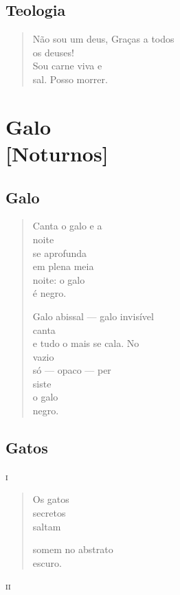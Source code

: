 \chapter{Teologia}

\begin{verse}
Não sou um deus, Graças a todos\\
os deuses!\\
Sou carne viva e\\
sal. Posso morrer.
\end{verse}

\part*{Galo\\ {[}Noturnos{]}}

\chapter{Galo}

\begin{verse}
Canta o galo e a\\
noite\\
se aprofunda\\
em plena meia\\
noite: o galo\\
é negro.

Galo abissal --- galo invisível\\
canta\\
e tudo o mais se cala. No\\
vazio\\
só --- opaco --- per\\
siste\\
o galo\\
negro.
\end{verse}

\chapter{Gatos}

\forceindent\textsc{i}

\begin{verse}
Os gatos\\
secretos\\
saltam

somem no abstrato\\
escuro.
\end{verse}

\medskip
\textsc{ii}

